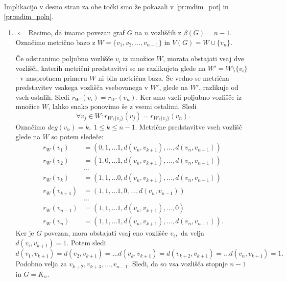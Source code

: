 \documentclass[mat1, tisk]{fmfdelo}
\newcommand{\1}{(1, 1, \ldots, 1)}
\newcommand{\2}{(2, 2, \ldots, 2)}
\begin{document}
\begin{dokaz}
    Implikacijo v desno stran za obe točki smo že pokazali v \ref{pr:mdim_pot} in 
    \ref{pr:mdim_poln}.
    \begin{enumerate}
        \item $\Leftarrow$ 
        Recimo, da imamo povezan graf $G$ na $n$ vozliščih z $\beta(G) = n - 1.$ Označimo metrično bazo
        z $W = \{v_1, v_2, \ldots, v_{n-1}\}$ in $V(G) = W \cup \{v_n\}$. 
        
        Če odstranimo poljubno vozlišče $v_i$ iz množice $W$, morata obstajati vsaj dve vozlišči, katerih metrični 
        predstavitvi se ne razlikujeta glede na $W' = W \setminus \{v_i \}$ - v nasprotnem primeru $W$ ni bila metrična baza. 
        Še vedno se metrična predstavitev vsakega vozlišča vsebovanega v $W'$, glede na $W'$, razlikuje od vseh ostalih. 
        Sledi $r_{W'}(v_i) = r_{W'}(v_n)$.
        Ker smo vzeli poljubno vozlišče iz množice $W$, lahko enako ponovimo še z vsemi ostalimi. Sledi 
        $$\forall v_j \in W:  r_{W \setminus \{v_j\}}(v_j)= r_{W \setminus \{v_j\}}(v_n).$$
        Označimo $deg(v_n) = k, \; 1 \leq k \leq n-1$. Metrične predstavitve vseh vozlišč glede na $W$ so potem sledeče:
        \begin{align*}
            r_W(v_1) & = (0, 1, \ldots 1, d(v_n, v_{k+1}), \ldots,d(v_n, v_{n-1})) \\
            r_W(v_2) & = (1, 0, \ldots 1, d(v_n, v_{k+1}), \ldots,d(v_n, v_{n-1}))\\
            & \dots \\
            r_W(v_k)  & = (1, 1, \ldots 0, d(v_n, v_{k+1}), \ldots,d(v_n, v_{n-1}))\\
            r_W(v_{k+1}) & = (1, 1, \ldots 1, 0, \ldots,d(v_n, v_{n-1})) \\
            & \dots \\
            r_W(v_{n - 1}) & = (1, 1, \ldots 1, d(v_n, v_{k+1}), \ldots, 0) \\
            r_W(v_n)  & = (1, 1, \ldots 1, d(v_n, v_{k+1}), \ldots,d(v_n, v_{n-1})).
        \end{align*}
        Ker je $G$ povezan, mora obstajati vsaj eno vozlišče $v_i,$ da velja $d(v_i, v_{k+1}) = 1.$ Potem sledi
        $$d(v_1, v_{k+1}) = d(v_2, v_{k+1}) = \ldots d(v_k, v_{k+1}) = d(v_{k+2}, v_{k+1}) = \ldots d(v_n, v_{k+1}) = 1.$$
        Podobno velja za $v_{k+2}, v_{k+3}, \ldots, v_{n-1}.$ Sledi, da so vsa vozlišča stopnje $n-1$ in $G = K_n.$
        

\end{enumerate}
\end{dokaz}
\end{document}
